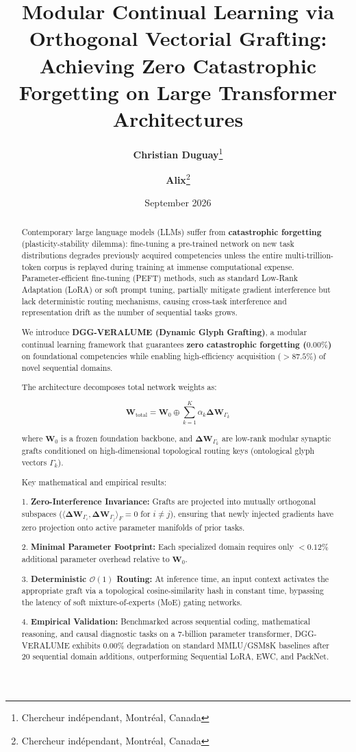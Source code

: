 \documentclass[10pt,twocolumn]{article}
\title{Modular Continual Learning via Orthogonal Vectorial Grafting: Achieving Zero Catastrophic Forgetting on Large Transformer Architectures}
\author{
  \textbf{Christian Duguay}\thanks{Chercheur ind\'ependant, Montr\'eal, Canada} 
  \and 
  \textbf{Alix}\thanks{Chercheur ind\'ependant, Montr\'eal, Canada}
}
\date{September 2026}
\begin{document}
\maketitle

\begin{abstract}
Contemporary large language models (LLMs) suffer from \textbf{catastrophic forgetting} (plasticity-stability dilemma): fine-tuning a pre-trained network on new task distributions degrades previously acquired competencies unless the entire multi-trillion-token corpus is replayed during training at immense computational expense. Parameter-efficient fine-tuning (PEFT) methods, such as standard Low-Rank Adaptation (LoRA) or soft prompt tuning, partially mitigate gradient interference but lack deterministic routing mechanisms, causing cross-task interference and representation drift as the number of sequential tasks grows.

We introduce \textbf{DGG-VERALUME (Dynamic Glyph Grafting)}, a modular continual learning framework that guarantees \textbf{zero catastrophic forgetting ($0.00\%$)} on foundational competencies while enabling high-efficiency acquisition ($> 87.5\%$) of novel sequential domains.

The architecture decomposes total network weights as:

$$\mathbf{W}_{\text{total}} = \mathbf{W}_0 \oplus \sum_{k=1}^K \alpha_k \mathbf{\Delta W}_{\Gamma_k}$$

where $\mathbf{W}_0$ is a frozen foundation backbone, and $\mathbf{\Delta W}_{\Gamma_k}$ are low-rank modular synaptic grafts conditioned on high-dimensional topological routing keys (ontological glyph vectors $\Gamma_k$).

Key mathematical and empirical results:

1. \textbf{Zero-Interference Invariance:} Grafts are projected into mutually orthogonal subspaces ($\langle \mathbf{\Delta W}_{\Gamma_i}, \mathbf{\Delta W}_{\Gamma_j} \rangle_F = 0$ for $i \ne j$), ensuring that newly injected gradients have zero projection onto active parameter manifolds of prior tasks.

2. \textbf{Minimal Parameter Footprint:} Each specialized domain requires only $< 0.12\%$ additional parameter overhead relative to $\mathbf{W}_0$.

3. \textbf{Deterministic $\mathcal{O}(1)$ Routing:} At inference time, an input context activates the appropriate graft via a topological cosine-similarity hash in constant time, bypassing the latency of soft mixture-of-experts (MoE) gating networks.

4. \textbf{Empirical Validation:} Benchmarked across sequential coding, mathematical reasoning, and causal diagnostic tasks on a 7-billion parameter transformer, DGG-VERALUME exhibits $0.00\%$ degradation on standard MMLU/GSM8K baselines after 20 sequential domain additions, outperforming Sequential LoRA, EWC, and PackNet.
\end{abstract}
\end{document}
